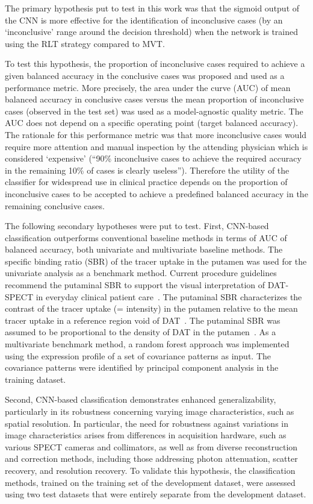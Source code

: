 
The primary hypothesis put to test in this work was that the sigmoid output of the CNN is more effective for the identification of inconclusive cases 
(by an `inconclusive' range around the decision threshold) when the network is trained using the RLT strategy compared to MVT.

To test this hypothesis, the proportion of inconclusive cases required to achieve a given balanced accuracy in the conclusive cases 
was proposed and used as a performance metric.
More precisely, the area under the curve (AUC) of mean balanced accuracy in conclusive cases versus the mean proportion of inconclusive cases 
(observed in the test set) was used as a model-agnostic quality metric. 
The AUC does not depend on a specific operating point (target balanced accuracy).  
The rationale for this performance metric was that more inconclusive cases would require more attention and manual inspection 
by the attending physician which is considered `expensive'
(“90\% inconclusive cases to achieve the required accuracy in the remaining 10\% of cases is clearly useless”).
Therefore the utility of the classifier for widespread use in clinical practice depends on 
the proportion of inconclusive cases to be accepted to achieve a predefined balanced accuracy in the remaining conclusive cases. 

The following secondary hypotheses were put to test. 
First, CNN-based classification outperforms conventional baseline methods in terms of AUC of balanced accuracy, 
both univariate and multivariate baseline methods. 
The specific binding ratio (SBR) of the tracer uptake in the putamen was used for the univariate analysis as a benchmark method.
Current procedure guidelines recommend the putaminal SBR to support the visual interpretation of DAT-SPECT in everyday clinical patient care~\citep{Morbelli2020}.
The putaminal SBR characterizes the contrast of the tracer uptake (= intensity) in the putamen relative to the mean tracer uptake in a reference 
region void of DAT~\citep{Buchert2019}.
The putaminal SBR was assumed to be proportional to the density of DAT in the putamen~\citep{Buchert2019}. 
As a multivariate benchmark method, a random forest approach was implemented using the expression profile of a set of covariance patterns as input. 
The covariance patterns were identified by principal component analysis in the training dataset. 

Second, CNN-based classification demonstrates enhanced generalizability, 
particularly in its robustness concerning varying image characteristics, such as spatial resolution.
In particular, the need for robustness against variations in image characteristics arises from
differences in acquisition hardware, 
such as various SPECT cameras and collimators, 
as well as from diverse reconstruction and correction methods, 
including those addressing photon attenuation, scatter recovery, and resolution recovery.
To validate this hypothesis, the classification methods, trained on the training set of the development dataset,
were assessed using two test datasets that were entirely separate from the development dataset.

